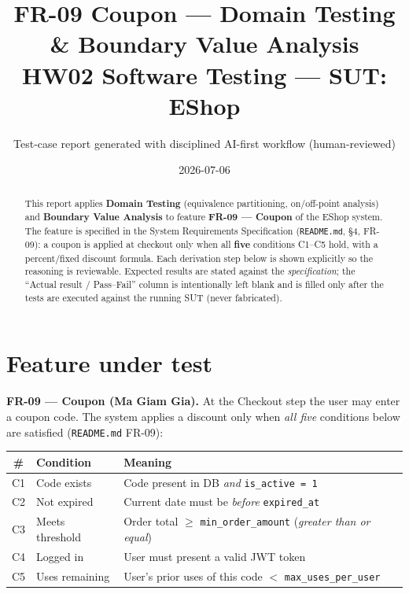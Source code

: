 \documentclass[11pt,a4paper]{article}
\title{\textbf{FR-09 Coupon --- Domain Testing \& Boundary Value Analysis}\\[2pt]
\large HW02 Software Testing --- SUT: EShop}
\author{Test-case report generated with disciplined AI-first workflow (human-reviewed)}
\date{2026-07-06}
\newcommand{\code}[1]{\texttt{#1}}
\begin{document}
\maketitle

\begin{abstract}
\noindent This report applies \textbf{Domain Testing} (equivalence partitioning,
on/off-point analysis) and \textbf{Boundary Value Analysis} to feature
\textbf{FR-09 --- Coupon} of the EShop system. The feature is specified in the
System Requirements Specification (\code{README.md}, \S4, FR-09): a coupon is
applied at checkout only when all \textbf{five} conditions C1--C5 hold, with a
percent/fixed discount formula. Each derivation step below is shown explicitly so
the reasoning is reviewable. Expected results are stated against the
\emph{specification}; the ``Actual result / Pass--Fail'' column is intentionally
left blank and is filled only after the tests are executed against the running
SUT (never fabricated).
\end{abstract}

\section{Feature under test}

\textbf{FR-09 --- Coupon (Ma Giam Gia).} At the Checkout step the user may enter a
coupon code. The system applies a discount only when \emph{all five} conditions
below are satisfied (\code{README.md} FR-09):

\begin{center}
\begin{tabular}{@{}c L{3.2cm} L{9.5cm}@{}}
\toprule
\# & Condition & Meaning \\
\midrule
C1 & Code exists & Code present in DB \emph{and} \code{is\_active = 1} \\
C2 & Not expired & Current date must be \emph{before} \code{expired\_at} \\
C3 & Meets threshold & Order total $\ge$ \code{min\_order\_amount} (\emph{greater than or equal}) \\
C4 & Logged in & User must present a valid JWT token \\
C5 & Uses remaining & User's prior uses of this code $<$ \code{max\_uses\_per\_user} \\
\bottomrule
\end{tabular}
\end{center}
\end{document}
